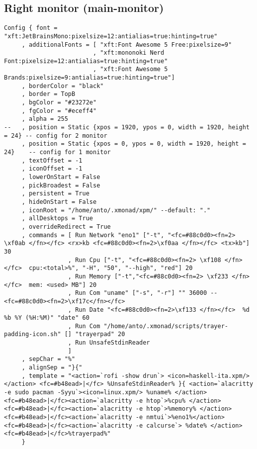 \documentclass[11pt]{article}
\begin{document}
\subsection{Right monitor (main-monitor)}
\label{sec:org9267859}
\begin{verbatim}
Config { font = "xft:JetBrainsMono:pixelsize=12:antialias=true:hinting=true"
     , additionalFonts = [ "xft:Font Awesome 5 Free:pixelsize=9"
                         , "xft:mononoki Nerd Font:pixelsize=12:antialias=true:hinting=true"
                         , "xft:Font Awesome 5 Brands:pixelsize=9:antialias=true:hinting=true"]
     , borderColor = "black"
     , border = TopB
     , bgColor = "#23272e"
     , fgColor = "#eceff4"
     , alpha = 255
--   , position = Static {xpos = 1920, ypos = 0, width = 1920, height = 24} -- config for 2 monitor
     , position = Static {xpos = 0, ypos = 0, width = 1920, height = 24}    -- config for 1 monitor
     , textOffset = -1
     , iconOffset = -1
     , lowerOnStart = False
     , pickBroadest = False
     , persistent = True
     , hideOnStart = False
     , iconRoot = "/home/anto/.xmonad/xpm/" --default: "."
     , allDesktops = True
     , overrideRedirect = True
     , commands = [ Run Network "eno1" ["-t", "<fc=#88c0d0><fn=2> \xf0ab </fn></fc> <rx>kb <fc=#88c0d0><fn=2>\xf0aa </fn></fc> <tx>kb"] 30
                  , Run Cpu ["-t", "<fc=#88c0d0><fn=2> \xf108 </fn></fc>  cpu:<total>%", "-H", "50", "--high", "red"] 20
                  , Run Memory ["-t","<fc=#88c0d0><fn=2> \xf233 </fn></fc>  mem: <used> MB"] 20
                  , Run Com "uname" ["-s", "-r"] "" 36000 -- <fc=#88c0d0><fn=2>\xf17c</fn></fc>
                  , Run Date "<fc=#88c0d0><fn=2>\xf133 </fn></fc>  %d %b %Y (%H:%M)" "date" 60 
                  , Run Com "/home/anto/.xmonad/scripts/trayer-padding-icon.sh" [] "trayerpad" 20
                  , Run UnsafeStdinReader 
                  ]
     , sepChar = "%"
     , alignSep = "}{"
     , template = "<action=`rofi -show drun`> <icon=haskell-ita.xpm/></action> <fc=#b48ead>|</fc> %UnsafeStdinReader% }{ <action=`alacritty -e sudo pacman -Syyu`><icon=linux.xpm/> %uname% </action> <fc=#b48ead>|</fc><action=`alacritty -e htop`>%cpu% </action><fc=#b48ead>|</fc><action=`alacritty -e htop`>%memory% </action><fc=#b48ead>|</fc><action=`alacritty -e nmtui`>%eno1%</action> <fc=#b48ead>|</fc><action=`alacritty -e calcurse`> %date% </action><fc=#b48ead>|</fc>%trayerpad%"
     }
\end{verbatim}
\end{document}
